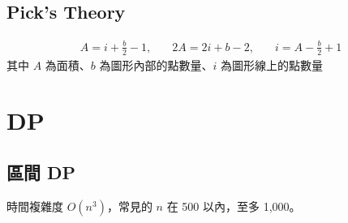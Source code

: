 \documentclass[a4paper,10pt,twocolumn,oneside]{article}
\newcommand{\inputcpp}[1]{}  %
\begin{document}




\subsection{Pick's Theory}
\begin{align*}
  A = i + \frac{b}{2} - 1, \quad &
  2A = 2i + b - 2, \quad         &
  i = A - \frac{b}{2} + 1
\end{align*}
其中 $A$ 為面積、$b$ 為圖形內部的點數量、$i$ 為圖形線上的點數量
\inputcpp{geometry/picks_theory.cpp}


\section{DP}

\subsection{區間 DP}
時間複雜度 $O(n^3)$，常見的 $n$ 在 500 以內，至多 1,000。
\inputcpp{DP/range.cpp}
\end{document}
